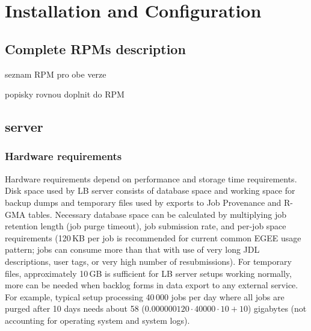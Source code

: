 \section{Installation and Configuration}

\subsection{Complete RPMs description}


seznam RPM pro obe verze

popisky rovnou doplnit do RPM

\subsection{\LB server}

\subsubsection{Hardware requirements}
\label{inst:hw_req}

Hardware requirements depend on performance and storage time requirements.
Disk space used by LB server consists of database space and working space 
for backup dumps and temporary files used by exports to Job Provenance and
R-GMA tables. Necessary database space can be calculated by multiplying 
job retention length (job purge timeout), job submission rate, and  
per-job space requirements (120\,KB per job is recommended for current common 
EGEE usage pattern; jobs can consume more than that with use of very long
JDL descriptions, user tags, or very high number of resubmissions).
For temporary files, approximately 10\,GB is sufficient for LB server setups
working normally, more can be needed when backlog forms in data export
to any external service. For example, typical setup processing 40\,000 jobs per 
day where all jobs are purged after 10 days needs about 58
($0.000000120\cdot 40000\cdot 10 + 10$) gigabytes (not accounting for operating 
system and system logs).


